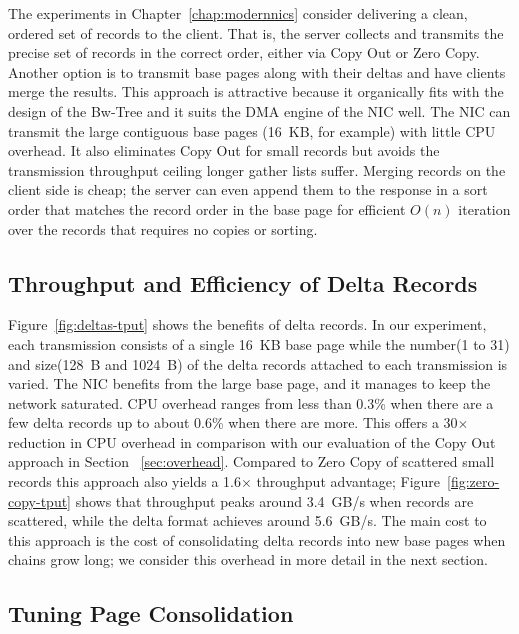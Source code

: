 The experiments in Chapter~\ref{chap:modernnics} consider delivering a clean, ordered set of records to the
client. That is, the server collects and transmits the precise set of records
in the correct order, either via Copy Out or Zero Copy. Another option is to
transmit base pages along with their deltas and have clients merge the results.
This approach is attractive because it organically fits with the design of the
Bw-Tree and it suits the DMA engine of the NIC well.  The NIC can transmit the
large contiguous base pages (16~KB, for example) with little CPU overhead.
It also eliminates Copy Out for small records but avoids the transmission
throughput ceiling longer gather lists suffer. %
Merging records on the client side is cheap; the server can even append them to
the response in a sort order that matches the record order in the base page for
efficient $O(n)$ iteration over the records that requires no copies or sorting.


\subsection{Throughput and Efficiency of Delta Records}
\label{sec:delta-tput-efficiency}
Figure~\ref{fig:deltas-tput} shows the benefits of delta records. In our
experiment, each transmission consists of a single 16~KB base page while the
number(1 to 31) and size(128~B and 1024~B) of the delta records attached to each transmission is varied.
The NIC benefits from the large base page, and it manages to keep the network
saturated. CPU overhead ranges from less than 0.3\% when there are a few delta
records up to about 0.6\% when there are more. This offers a 30$\times$ reduction 
in CPU overhead in comparison with our evaluation of the Copy Out approach in 
Section ~\ref{sec:overhead}. Compared to Zero Copy of scattered
small records this approach also yields a 1.6$\times$ throughput advantage;
Figure~\ref{fig:zero-copy-tput} shows that throughput peaks around 3.4~GB/s when
records are scattered, while the delta format achieves around  5.6~GB/s. The main cost 
to this approach is the cost of consolidating delta records into new base pages 
when chains grow long; we consider this overhead in more detail in the next section.


\subsection{Tuning Page Consolidation}
\label{sec:consolidation}


